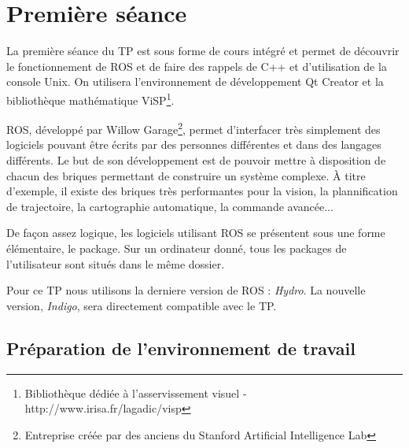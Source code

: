 \documentclass[12pt,a4paper]{article}
\begin{document}
\section{Première séance}

\hspace{12pt}La première séance du TP est sous forme de cours intégré et permet de découvrir le fonctionnement de ROS et de faire des rappels de C++ et d'utilisation de la console Unix. On utilisera l'environnement de développement Qt Creator et la bibliothèque mathématique ViSP\footnote{ Bibliothèque dédiée à l'asservissement visuel - http://www.irisa.fr/lagadic/visp}.

ROS, développé par Willow Garage\footnote{ Entreprise créée par des anciens du Stanford Artificial Intelligence Lab}, permet d'interfacer très simplement des logiciels pouvant être écrits par des personnes différentes et dans des langages différents.
Le but de son développement est de pouvoir mettre à disposition de chacun des briques permettant de construire un système complexe.
À titre d'exemple, il existe des briques très performantes pour la vision, la plannification de trajectoire, la cartographie automatique, la commande avancée...

De façon assez logique, les logiciels utilisant ROS se présentent sous une forme élémentaire, le package. Sur un ordinateur donné, tous les packages de l'utilisateur sont situés dans le même dossier.

Pour ce TP nous utilisons la derniere version de ROS : \emph{Hydro}. La nouvelle version, \emph{Indigo}, sera directement compatible avec le TP.

\subsection{Préparation de l'environnement de travail}

\def\bin{<binôme>}
\end{document}
